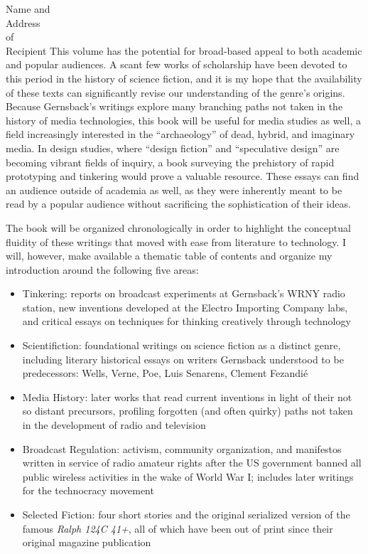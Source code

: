 \documentclass[fontsize=12pt, paper=a4]{scrlttr2}
\begin{document}
\begin{letter}{Name and \\ Address \\ of \\ Recipient}
This volume has the potential for broad-based appeal to both academic
and popular audiences. A scant few works of scholarship have been
devoted to this period in the history of science fiction, and it is my
hope that the availability of these texts can significantly revise our
understanding of the genre's origins. Because Gernsback's writings
explore many branching paths not taken in the history of media
technologies, this book will be useful for media studies as well, a
field increasingly interested in the ``archaeology'' of dead, hybrid,
and imaginary media. In design studies, where ``design fiction'' and
``speculative design'' are becoming vibrant fields of inquiry, a book
surveying the prehistory of rapid prototyping and tinkering would prove
a valuable resource. These essays can find an audience outside of
academia as well, as they were inherently meant to be read by a popular
audience without sacrificing the sophistication of their ideas.

The book will be organized chronologically in order to highlight the
conceptual fluidity of these writings that moved with ease from
literature to technology. I will, however, make available a thematic
table of contents and organize my introduction around the following five
areas:

\begin{itemize}
\itemsep1pt\parskip0pt
\item
  Tinkering: reports on broadcast experiments at Gernsback's WRNY radio
  station, new inventions developed at the Electro Importing Company
  labs, and critical essays on techniques for thinking creatively
  through technology
\item
  Scientifiction: foundational writings on science fiction as a distinct
  genre, including literary historical essays on writers Gernsback
  understood to be predecessors: Wells, Verne, Poe, Luis Senarens,
  Clement Fezandié
\item
  Media History: later works that read current inventions in light of
  their not so distant precursors, profiling forgotten (and often
  quirky) paths not taken in the development of radio and television
\item
  Broadcast Regulation: activism, community organization, and manifestos
  written in service of radio amateur rights after the US government
  banned all public wireless activities in the wake of World War I;
  includes later writings for the technocracy movement
\item
  Selected Fiction: four short stories and the original serialized
  version of the famous \emph{Ralph 124C 41+}, all of which have been
  out of print since their original magazine publication
\end{itemize}


\end{letter}
\end{document}
